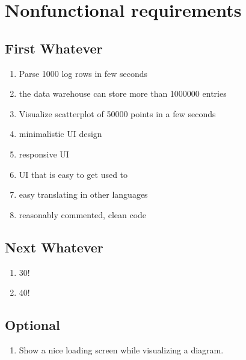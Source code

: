 \section{Nonfunctional requirements}

\renewcommand{\theenumi}{/NF\arabic{enumi}0/}
\renewcommand{\labelenumi}{\theenumi}


\subsection{First Whatever}

\begin{enumerate}
  \item Parse 1000 log rows in few seconds
  \item the data warehouse can store more than 1000000 entries
  \item Visualize scatterplot of 50000 points in a few seconds
  \item minimalistic UI design
  \item responsive UI
  \item UI that is easy to get used to
  \item easy translating in other languages
  \item reasonably commented, clean code
\end{enumerate}

\subsection{Next Whatever}

\begin{enumerate}[resume] %
  \item 30!
  \item 40!
\end{enumerate}

\subsection{Optional}

\begin{enumerate}
  \item Show a nice loading screen while visualizing a diagram. %
\end{enumerate}